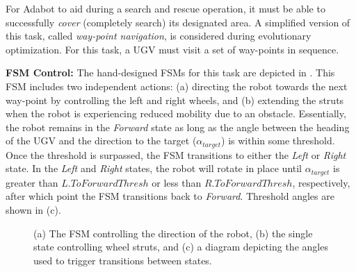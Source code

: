 For Adabot to aid during a search and rescue operation, it must be able to successfully \emph{cover} (completely search) its designated area.
%
A simplified version of this task, called \emph{way-point navigation}, is considered during evolutionary optimization.
%
For this task, a UGV must visit a set of way-points in sequence.
%


\noindent
\textbf{FSM Control:}
The hand-designed FSMs for this task are depicted in .
%
This FSM includes two independent actions: (a) directing the robot towards the next way-point by controlling the left and right wheels, and (b) extending the struts when the robot is experiencing reduced mobility due to an obstacle.
%
Essentially, the robot remains in the \emph{Forward} state as long as the angle between the heading of the UGV and the direction to the target ($\alpha_{\mathit{target}}$) is within some threshold.
%
Once the threshold is surpassed, the FSM transitions to either the \emph{Left} or \emph{Right} state.
%
In the \emph{Left} and \emph{Right} states, the robot will rotate in place until $\alpha_{\mathit{target}}$ is greater than $L.ToForwardThresh$ or less than $R.ToForwardThresh$, respectively, after which point the FSM transitions back to \emph{Forward}.
%
Threshold angles are shown in (c).

\begin{figure}[!ht]
    \centering

    \hfil




    \caption{(a) The FSM controlling the direction of the robot, (b) the single state controlling wheel struts, and (c) a diagram depicting the angles used to trigger transitions between states.}
    \label{fig:fsm}


\end{figure}


